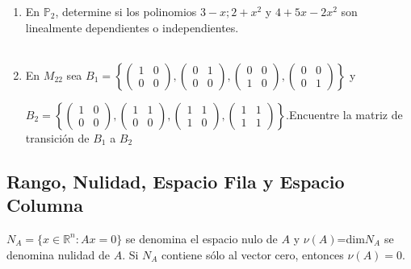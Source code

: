 \begin{ejem}
\begin{enumerate}
\item
En $\mathbb{P}_2$, determine si los polinomios $3-x; 2+x^2$ y $4+5x-2x^2$ son linealmente dependientes o independientes.
\\\

\item
En $M_{22}$ sea $B_1 = \left\{ \begin{pmatrix}  1 & 0 \\ 0 & 0 \end{pmatrix}, \begin{pmatrix}  0 & 1 \\ 0 & 0 \end{pmatrix}, \begin{pmatrix}  0 & 0 \\ 1 & 0 \end{pmatrix}, \begin{pmatrix}  0 & 0 \\ 0 & 1 \end{pmatrix} \right\}$ y 

$B_2 = \left\{ \begin{pmatrix}  1 & 0 \\ 0 & 0 \end{pmatrix}, \begin{pmatrix}  1 & 1 \\ 0 & 0 \end{pmatrix}, \begin{pmatrix}  1 & 1 \\ 1 & 0 \end{pmatrix}, \begin{pmatrix}  1 & 1 \\ 1 & 1 \end{pmatrix} \right\}$.Encuentre la matriz de transición de $B_1$ a $B_2$
\end{enumerate}
\end{ejem}





\subsection{Rango, Nulidad, Espacio Fila y Espacio Columna}

\begin{defin}
$N_A = \{ x \in \mathbb{R}^n:Ax =0 \}$ se denomina el espacio nulo de $A$ y $\nu (A)$=dim$N_A$ se denomina nulidad de $A$. Si $N_A$ contiene sólo al vector cero, entonces $\nu (A) = 0$.
\end{defin}

